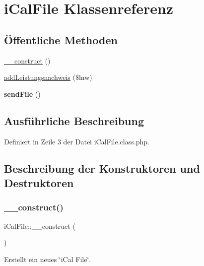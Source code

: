 \hypertarget{classi_cal_file}{}\section{i\+Cal\+File Klassenreferenz}
\label{classi_cal_file}
\subsection*{Öffentliche Methoden}
\begin{DoxyCompactItemize}
\item 
\mbox{\hyperlink{classi_cal_file_aec1d7f307a5f5bf2a19b32f894e8a349}{\+\_\+\+\_\+construct}} ()
\item 
\mbox{\hyperlink{classi_cal_file_ae4381422fa804435572b690ff7ddc29e}{add\+Leistungsnachweis}} (\$lnw)
\item 
\mbox{\label{classi_cal_file_aa187516fe1133eb1ac574d3699f01f58}} 
{\bfseries send\+File} ()
\end{DoxyCompactItemize}


\subsection{Ausführliche Beschreibung}


Definiert in Zeile 3 der Datei i\+Cal\+File.\+class.\+php.



\subsection{Beschreibung der Konstruktoren und Destruktoren}
\mbox{\label{classi_cal_file_aec1d7f307a5f5bf2a19b32f894e8a349}} 
\subsubsection{\texorpdfstring{\+\_\+\+\_\+construct()}{\_\_construct()}}
{\footnotesize\ttfamily i\+Cal\+File\+::\+\_\+\+\_\+construct (\begin{DoxyParamCaption}{ }\end{DoxyParamCaption})}

Erstellt ein neues \char`\"{}i\+Cal File\char`\"{}. 

